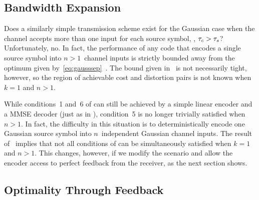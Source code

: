 \subsection{Bandwidth Expansion}

Does a similarly simple transmission scheme exist for the Gaussian case when the
channel accepts more than one input for each source symbol, \ie, ${\tau_c} > {\tau_s}$?
Unfortunately, no. In fact, the performance of any code that encodes a single
source symbol into $n>1$~channel inputs is strictly bounded away from the
optimum given by~\eqref{eq:gausssep}~\cite{IngberLZF2008}.  The bound given
in~\cite{IngberLZF2008} is not necessarily tight, however, so the region of
achievable cost and distortion pairs is not known when $k = 1$ and $n > 1$. 

While conditions~1 and~6 of  can still be achieved
by a simple linear encoder and a MMSE decoder (just as in ),
condition~5 is no longer trivially satisfied when $n > 1$. In fact, the
difficulty in this situation is to deterministically encode one Gaussian source
symbol into $n$~independent Gaussian channel inputs. The result
of~\cite{IngberLZF2008} implies that not all conditions of
 can be simultaneously satisfied when $k = 1$ and
$n > 1$.  This changes, however, if we modify the scenario and allow the encoder
access to perfect feedback from the receiver, as the next section shows.

%


\subsection{Optimality Through Feedback}

